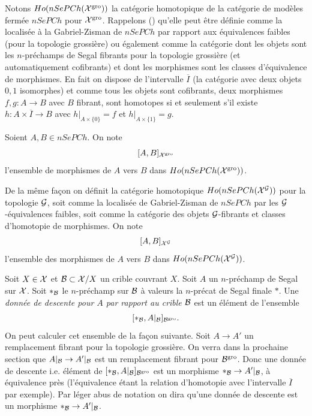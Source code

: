 \documentclass[12pt]{article}
\newcommand{\Gg}{{\cal G}}
\newcommand{\Bb}{{\cal B}}
\newcommand{\Xx}{{\cal X}}
\begin{document}
Notons $Ho(nSePCh(\Xx ^{\rm gro}))$ la cat\'egorie homotopique
de la cat\'egorie de mod\`eles fer\-m\'ee $nSePCh$ pour $\Xx^{\rm gro}$.
Rappelons (\cite{Quillen}) qu'elle peut \^etre d\'efinie comme la localis\'ee
\`a la Gabriel-Zisman \cite{GabrielZisman} de $nSePCh$ par rapport aux
\'equivalences faibles (pour la topologie grossi\`ere) ou \'egalement comme la
cat\'egorie dont les objets sont les $n$-pr\'echamps de Segal fibrants pour la
topologie grossi\`ere (et automatiquement cofibrants) et dont les morphismes
sont les classes d'\'equivalence de morphismes. En fait on dispose de
l'intervalle
$\overline{I}$ (la cat\'egorie avec deux objets $0,1$ isomorphes) et comme tous
les objets sont cofibrants, deux morphismes $f,g:A\rightarrow B$ avec $B$
fibrant, sont homotopes si et seulement s'il existe $h: A\times
\overline{I}\rightarrow B$ avec $h|_{A\times \{ 0\} }=f$ et
$h|_{A\times \{ 1\} }=g$.

Soient $A, B\in nSePCh$. On note
$$
[A,B]_{\Xx ^{\rm gro}}
$$
l'ensemble de morphismes de $A$ vers $B$ dans $Ho(nSePCh(\Xx ^{\rm gro}))$.

De la m\^eme fa\c{c}on on d\'efinit la cat\'egorie homotopique
 $Ho(nSePCh(\Xx ^{\Gg}))$ pour la
topologie $\Gg$,  soit comme la localis\'ee de Gabriel-Zisman de $nSePCh$ par
les $\Gg$-\'equivalences faibles, soit comme la cat\'egorie des objets
$\Gg$-fibrants et classes d'homotopie de morphismes. On note
$$
[A,B]_{\Xx ^{\Gg}}
$$
l'ensemble des morphismes de $A$ vers $B$ dans $Ho(nSePCh(\Xx ^{\Gg}))$.

Soit $X\in \Xx$ et $\Bb \subset \Xx /X$ un crible couvrant $X$.
Soit $A$ un $n$-pr\'echamp de Segal sur $\Xx$. Soit $\ast _{\Bb}$ le
$n$-pr\'echamp sur $\Bb$ \`a valeurs la $n$-pr\'ecat de Segal finale
$\ast$. Une {\em
donn\'ee de descente pour $A$ par rapport au crible $\Bb$} est un \'el\'ement de
l'ensemble
$$
[\ast _{\Bb},A|_{\Bb}]_{\Bb ^{\rm gro}}.
$$
On peut calculer cet ensemble de la fa\c{c}on suivante. Soit $A\rightarrow A'$
un remplacement fibrant pour la topologie grossi\`ere. On verra dans la
prochaine section que $A|_{\Bb}\rightarrow A'|_{\Bb}$ est un remplacement
fibrant pour $\Bb ^{\rm gro}$. Donc une donn\'ee de descente i.e.
\'el\'ement de
$[\ast _{\Bb},A|_{\Bb}]_{\Bb ^{\rm gro}}$ est un morphisme $\ast
_{\Bb}\rightarrow A'|_{\Bb}$, \`a \'equivalence pr\`es (l'\'equivalence \'etant
la relation d'homotopie avec l'intervalle $\overline{I}$ par exemple).
Par l\'eger abus de notation on dira qu'une donn\'ee de descente est un
morphisme $\ast _{\Bb}\rightarrow A'|_{\Bb}$.
\end{document}
